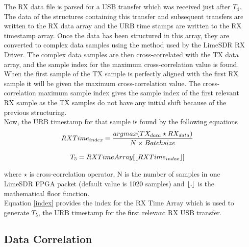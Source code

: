 The RX data file is parsed for a \ac{USB} transfer which was received just after $T_4$.
The data of the structures containing this transfer and subsequent transfers are written to the RX data array and the URB time stamps are written to the RX timestamp array.
Once the data has been structured in this array, they are converted to complex data samples using the method used by the LimeSDR RX Driver.
The complex data samples are then cross-correlated with the TX data array, and the sample index for the maximum cross-correlation value is found.
When the first sample of the TX sample is perfectly aligned with the first RX sample it will be given the maximum cross-correlation value.
The cross-correlation maximum sample index gives the sample index of the first relevant RX sample as the TX samples do not have any initial shift because of the previous structuring.\\

Now, the URB timestamp for that sample is found by the following equations
\begin{equation}
    \centering
    RXTime_{index}=\frac{argmax(TX_{data} \star RX_{data})}{N \times Batchsize}
    \label{index}
\end{equation}

\begin{equation}
    \centering
    T_5 = RX Time Array[\floor*{RXTime_{index}}]
    \label{t5}
\end{equation}

where $\star$ is cross-correlation operator, N is the number of samples in one LimeSDR FPGA packet (default value is 1020 samples) and $\floor*{.}$ is the mathematical floor function.\\

Equation \ref{index} provides the index for the RX Time Array which is used to generate $T_5$, the URB timestamp for the first relevant RX USB transfer.

\subsection{Data Correlation} \label{data_corr}

